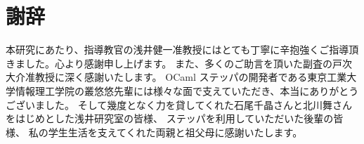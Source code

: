 \chapter*{謝辞}

本研究にあたり、指導教官の浅井健一准教授にはとても丁寧に辛抱強くご指導頂きました。心より感謝申し上げます。
また、多くのご助言を頂いた副査の戸次大介准教授に深く感謝いたします。
OCaml ステッパの開発者である東京工業大学情報理工学院の叢悠悠先輩には様々な面で支えていただき、本当にありがとうございました。
そして幾度となく力を貸してくれた石尾千晶さんと北川舞さんをはじめとした浅井研究室の皆様、
ステッパを利用していただいた後輩の皆様、
私の学生生活を支えてくれた両親と祖父母に感謝いたします。

